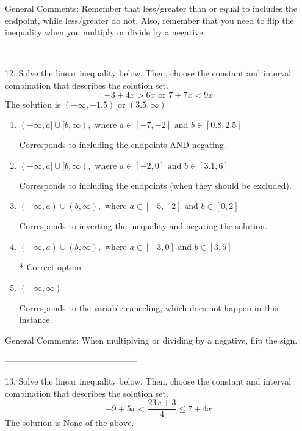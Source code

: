 \documentclass{extbook}[14pt]
\begin{document}
General Comments: Remember that less/greater than or equal to includes the endpoint, while less/greater do not. Also, remember that you need to flip the inequality when you multiply or divide by a negative.

-----------------------------------------------

12. Solve the linear inequality below. Then, choose the constant and interval combination that describes the solution set.
\[ -3 + 4 x > 6 x \text{ or } 7 + 7 x < 9 x \] 
The solution is $ (-\infty, -1.5) \text{ or } (3.5, \infty) $ 

\begin{enumerate}[label=\Alph*.] 
\item $ (-\infty, a] \cup [b, \infty), \text{ where } a \in [-7, -2] \text{ and } b \in [0.8, 2.5] $ 

 Corresponds to including the endpoints AND negating. 
\item $ (-\infty, a] \cup [b, \infty), \text{ where } a \in [-2, 0] \text{ and } b \in [3.1, 6] $ 

 Corresponds to including the endpoints (when they should be excluded). 
\item $ (-\infty, a) \cup (b, \infty), \text{ where } a \in [-5, -2] \text{ and } b \in [0, 2] $ 

 Corresponds to inverting the inequality and negating the solution. 
\item $ (-\infty, a) \cup (b, \infty), \text{ where } a \in [-3, 0] \text{ and } b \in [3, 5] $ 

  * Correct option. 
\item $ (-\infty, \infty) $ 

 Corresponds to the variable canceling, which does not happen in this instance. 
\end{enumerate} 
 
General Comments: When multiplying or dividing by a negative, flip the sign.

-----------------------------------------------

13. Solve the linear inequality below. Then, choose the constant and interval combination that describes the solution set.
\[ -9 + 5 x < \frac{23 x + 3}{4} \leq 7 + 4 x \] 
The solution is $ \text{None of the above.} $ 
\end{document}
